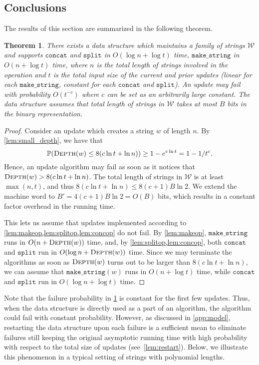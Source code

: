 \documentclass[a4paper]{article}
\newtheorem{theorem}{Theorem}[section]
\theoremstyle{remark}
\newcommand{\makeop}{\mathtt{make\_string}}
\newcommand{\concop}{\mathtt{concat}}
\newcommand{\splitop}{\mathtt{split}}
\newcommand{\depth}{\textsc{Depth}}
\newcommand{\str}{w}
\newcommand{\mword}{B}
\newcommand{\coll}{\mathcal{W}}
\begin{document}
\subsection{Conclusions}\label{sec:conclusions}

The results of this section are summarized in the following theorem.

\begin{theorem}\label{thm:data_structure}
There exists a data structure which maintains a family of strings $\coll$ and supports $\concop$ and $\splitop$ in $O(\log n +\log t)$
time, $\makeop$ in $O(n + \log t)$ time, where $n$ is the total length of strings involved in the operation and $t$
is the total input size of the current and prior updates (linear for each $\makeop$, constant for each $\concop$ and $\splitop$).
An update may fail with probability $O(t^{-c})$ where $c$ can be set as an arbitrarily large constant.
The data structure assumes that total length of strings in $\coll$ takes at most $\mword$ bits in the binary representation.
\end{theorem}

\begin{proof}
Consider an update which creates a string $\str$ of length $n$.
By \cref{lem:small_depth}, we have that $$\mathbb{P}(\depth(\str) \leq 8(c \ln t + \ln n)) \geq 1 - e^{c \ln t} = 1 - 1/t^{c}.$$
Hence, an update algorithm may fail as soon as it notices that $\depth(\str) > 8(c \ln t + \ln n)$.
The total length of strings in $\coll$ is at least $\max(n,t)$, and thus $8(c \ln t + \ln n)\le 8(c+1)\mword\ln2$.
We extend the machine word to $\mword'=4(c+1)\mword\ln 2 = O(B)$ bits, which results in a constant factor overhead in the running time.

This lets us assume that updates implemented according to \cref{lem:makeop,lem:splitop,lem:concop} do not fail.
By \cref{lem:makeop}, $\makeop$ runs in $O(n+\depth(\str))$ time, and, by \cref{lem:splitop,lem:concop}, both $\concop$ and $\splitop$ run in $O(\log n +\depth(\str))$ time.
Since we may terminate the algorithms as soon as $\depth(\str)$ turns out to be larger than $8(c \ln t + \ln n)$,
we can assume that $\makeop(\str)$ runs in $O(n+\log t)$ time, while $\concop$ and $\splitop$ run in $O(\log n +\log t)$ time.
\end{proof}

Note that the failure probability in \cref{thm:data_structure} is constant for the first few updates. 
Thus, when the data structure is directly used as a part of an algorithm, the algorithm could fail with constant probability.
However, as discussed in \cref{app:model}, restarting the data structure upon each failure is a sufficient mean to eliminate failures 
still keeping the original asymptotic running time with high probability with respect to the total size of updates (see~\cref{lem:restart}).
Below, we illustrate this phenomenon in a typical setting of strings with polynomial lengths.
\end{document}
